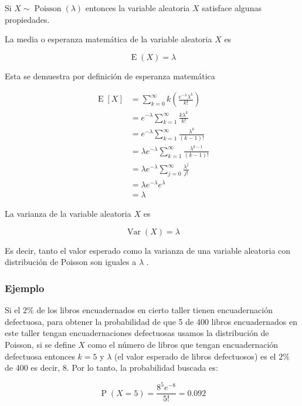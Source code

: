 \documentclass[]{book}
\theoremstyle{plain}
\theoremstyle{definition}
\theoremstyle{definition} %
\begin{document}
Si \(\displaystyle X\sim \operatorname {Poisson} (\lambda )\) entonces
la variable aleatoria \(X\) satisface algunas propiedades.

La media o esperanza matemática de la variable aleatoria \(X\) es

\[\displaystyle \operatorname {E} (X)=\lambda \]

Esta se demuestra por definición de esperanza matemática

\[\displaystyle {\begin{aligned}\operatorname {E} [X]&=\sum _{k=0}^{\infty }k\left({\frac {e^{-\lambda }\lambda ^{k}}{k!}}\right)\\&=e^{-\lambda }\sum _{k=1}^{\infty }{\frac {k\lambda ^{k}}{k!}}\\&=e^{-\lambda }\sum _{k=1}^{\infty }{\frac {\lambda ^{k}}{(k-1)!}}\\&=\lambda e^{-\lambda }\sum _{k=1}^{\infty }{\frac {\lambda ^{k-1}}{(k-1)!}}\\&=\lambda e^{-\lambda }\sum _{j=0}^{\infty }{\frac {\lambda ^{j}}{j!}}\\&=\lambda e^{-\lambda }e^{\lambda }\\&=\lambda \end{aligned}}\]

La varianza de la variable aleatoria \(X\) es

\[\displaystyle \operatorname {Var} (X)=\lambda \]

Es decir, tanto el valor esperado como la varianza de una variable
aleatoria con distribución de Poisson son iguales a \(\lambda\) .

\hypertarget{ejemplo-7}{%
\subsubsection{Ejemplo}\label{ejemplo-7}}

Si el \(\displaystyle 2\%\) de los libros encuadernados en cierto taller
tienen encuadernación defectuosa, para obtener la probabilidad de que 5
de 400 libros encuadernados en este taller tengan encuadernaciones
defectuosas usamos la distribución de Poisson, si se define \(X\) como
el número de libros que tengan encuadernación defectuosa entonces
\(\displaystyle k=5\) y \(\lambda\) (el valor esperado de libros
defectuosos) es el \(\displaystyle 2\%\) de 400 es decir, 8. Por lo
tanto, la probabilidad buscada es:

\[\displaystyle \operatorname {P} (X=5)={\frac {8^{5}e^{-8}}{5!}}=0.092\]
\end{document}
